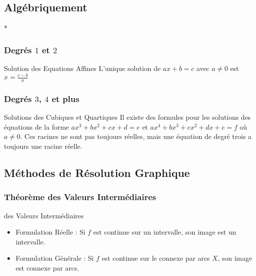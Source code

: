 \documentclass{beamercours}
\begin{document}
\subsection{Algébriquement}*
\begin{frame}
    \frametitle{Degrés $1$ et $2$}
    \vspace{-5pt}
    \begin{théorème}{Solution des Equations Affines}{}
        L'unique solution de $ax + b = c$ avec $a \neq 0$ est $x = \frac{c - b}{a}$
    \end{théorème}
    \vspace{-8pt}
\end{frame}
\begin{frame}
    \frametitle{Degrés $3$, $4$ et plus}
    \begin{théorème}{Solutions des Cubiques et Quartiques}{}
        Il existe des formules pour les solutions des équations de la forme $ax^{3} + bx^{2} + cx + d = e$ et $ax^{4} + bx^{3} + cx^{2} + dx + e = f$ où $a \neq 0$. Ces racines ne sont pas toujours réelles, mais une équation de degré trois a toujours une racine réelle.         
    \end{théorème}
\end{frame}

\subsection{Méthodes de Résolution Graphique}
\begin{frame}
    \frametitle{Théorème des Valeurs Intermédiaires}
    \begin{théorème}{des Valeurs Intermédiaires}{}
        \begin{itemize}[<+->]
            \item Formulation Réelle : Si $f$ est continue sur un intervalle, son image est un intervalle.
            \item Formulation Générale : Si $f$ est continue sur le connexe par arcs $X$, son image est connexe par arcs.
        \end{itemize}
    \end{théorème}
\end{frame}
\end{document}
